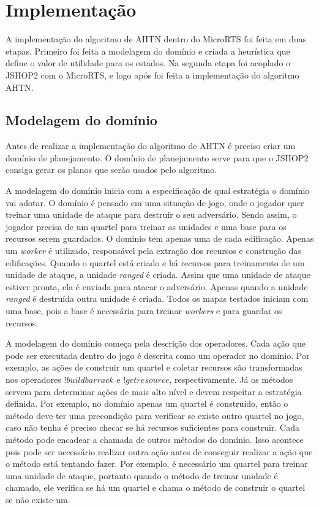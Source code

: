 
\chapter{\label{chap:impl}Implementação}

A implementação do algoritmo de AHTN dentro do MicroRTS foi feita em duas etapas.
Primeiro foi feita a modelagem do domínio e criada a heurística que define o valor de utilidade para os estados.
Na segunda etapa foi acoplado o JSHOP2 com o MicroRTS, e logo após foi feita a implementação do algoritmo AHTN.

\section{Modelagem do domínio}

Antes de realizar a implementação do algoritmo de AHTN é preciso criar um domínio de planejamento. 
O domínio de planejamento serve para que o JSHOP2 consiga gerar os planos que serão usados pelo algoritmo.

A modelagem do domínio inicia com a especificação de qual estratégia o domínio vai adotar.
O domínio é pensado em uma situação de jogo, onde o jogador quer treinar uma unidade de ataque para destruir o seu adversário.
Sendo assim, o jogador precisa de um quartel para treinar as unidades e uma base para os recursos serem guardados.
O domínio tem apenas uma de cada edificação.
Apenas um \textit{worker} é utilizado, responsável pela extração dos recursos e construção das edificações.
Quando o quartel está criado e há recursos para treinamento de um unidade de ataque, a unidade \textit{ranged} é criada.
Assim que uma unidade de ataque estiver pronta, ela é enviada para atacar o adversário.
Apenas quando a unidade \textit{ranged} é destruída outra unidade é criada.
Todos os mapas testados iniciam com uma base, pois a base é necessária para treinar \textit{workers} e para guardar os recursos.  

A modelagem do domínio começa pela descrição dos operadores.
Cada ação que pode ser executada dentro do jogo é descrita como um operador no domínio.
Por exemplo, as ações de construir um quartel e coletar recursos são transformadas nos operadores $!buildbarrack$ e $!getresource$, respectivamente.
Já os métodos servem para determinar ações de mais alto nível e devem respeitar a estratégia definida.
Por exemplo, no domínio apenas um quartel é construído, então o método deve ter uma precondição para verificar se existe outro quartel no jogo, caso não tenha é preciso checar se há recursos suficientes para construir. 
Cada método pode encadear a chamada de outros métodos do domínio.
Isso acontece pois pode ser necessário realizar outra ação antes de conseguir realizar a ação que o método está tentando fazer.
Por exemplo, é necessário um quartel para treinar uma unidade de ataque, portanto quando o método de treinar unidade é chamado, ele verifica se há um quartel e chama o método de construir o quartel se não existe um.

